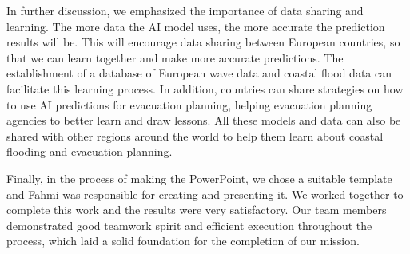 \documentclass[UTF8,a4paper,AutoFakeBold,AutoFakeSlant]{article}
\begin{document}
In further discussion, we emphasized the importance of data sharing and learning. The more data the AI ​​model uses, the more accurate the prediction results will be. This will encourage data sharing between European countries, so that we can learn together and make more accurate predictions. The establishment of a database of European wave data and coastal flood data can facilitate this learning process. In addition, countries can share strategies on how to use AI predictions for evacuation planning, helping evacuation planning agencies to better learn and draw lessons. All these models and data can also be shared with other regions around the world to help them learn about coastal flooding and evacuation planning.

Finally, in the process of making the PowerPoint, we chose a suitable template and Fahmi was responsible for creating and presenting it. We worked together to complete this work and the results were very satisfactory. Our team members demonstrated good teamwork spirit and efficient execution throughout the process, which laid a solid foundation for the completion of our mission.

% 
% 
% 
\end{document}
